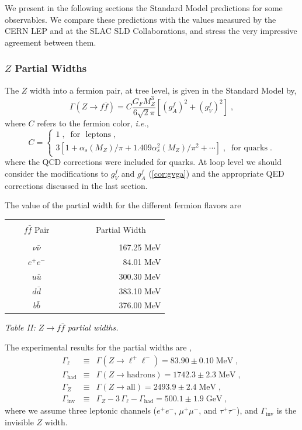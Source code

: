 \documentclass[12pt]{report}
\def\text#1{{\scriptstyle\mathrm{#1}}}
\newcommand{\ba}{\begin{array}}
\newcommand{\ea}{\end{array}}
\begin{document}
We present in the following sections the Standard Model predictions
for some observables. We compare these predictions with the values
measured by the CERN LEP and at the SLAC SLD Collaborations, and 
stress the very impressive agreement between them.

\subsubsection{$Z$ Partial Widths} \indent

The $Z$ width into a fermion pair, at tree level, is given in the
Standard Model by,
\begin{equation}
\Gamma(Z \to f \bar{f} ) = 
C \frac{G_F M_Z^3}{6\sqrt{2}\pi} \left[ (g_A^f)^2 + (g_V^f)^2 \right] \; ,
\label{gam:l}
\end{equation}
where $C$ refers to the fermion color, {\it i.e.},
\[
C = \left\{ \ba{l}
1 \; , \;\; \mbox{for { leptons}} \; ,\\
3 \left[ 1 + \alpha_s(M_Z)/\pi + 1.409 \alpha_s^2 (M_Z)/\pi^2 +
\cdots   \right] \; , \;\; \mbox{for quarks} \; .
 \ea \right.  
\]
where the QCD corrections were included for quarks. At loop level we
should consider the modifications to $g_V^f$ and $g_A^f$
(\ref{cor:gvga}) and the appropriate QED corrections discussed in the
last section. 

The value of the partial width for the different fermion flavors are
\begin{center}
\begin{tabular}{cr}
\hline\hline
&\\[-0.2cm]
~~~ $f \bar{f}$ Pair ~~~  & ~~~~~ Partial Width ~~~ \\[0.2cm]
\hline
&\\[-0.2cm]
$\nu \bar{\nu}$ & ~~~ 167.25 MeV \\ 
$e^+e^-$ 	& ~~~  84.01 MeV \\ 
$u\bar{u}$ 	& ~~~ 300.30 MeV \\ 
$d\bar{d}$ 	& ~~~ 383.10 MeV \\ 
$b\bar{b}$ 	& ~~~ 376.00 MeV \\ [0.2cm]
\hline\hline
\end{tabular}
\end{center}
\centerline{\it Table II: $Z \to f \bar{f}$ partial widths.}

\vskip 0.5cm
The experimental results for the partial widths are \cite{Lep:99},
\begin{eqnarray*}
\Gamma_\ell & \equiv & \Gamma(Z \to \ell^+ \ell^-) =  
83.90 \pm 0.10 \; \mbox{MeV} \; , 
\\ 
\Gamma_{\text{had}}    & \equiv & \Gamma(Z \to \mbox{hadrons}) =
1742.3 \pm 2.3 \; \mbox{MeV} \; , 
\\
\Gamma_Z & \equiv & \Gamma(Z \to \mbox{all}) =  2493.9 \pm 2.4 \; 
\mbox{MeV} \; , 
\\
\Gamma_{\text{inv}} & \equiv & \Gamma_Z - 3 \, 
\Gamma_\ell - \Gamma_{\text{had}} = 500.1 \pm 1.9 \; \mbox{GeV} \; , 
\end{eqnarray*}
where we assume three leptonic channels ($e^+e^-$, $\mu^+\mu^-$, and
$\tau^+\tau^-$), and $\Gamma_{\text{inv}}$ is the invisible $Z$
width. 
\end{document}
